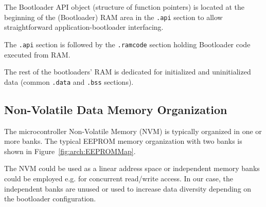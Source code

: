 The Bootloader API object (structure of function pointers) is located at the beginning of the (Bootloader) RAM area in the \texttt{.api} section to allow straightforward application-bootloader interfacing. 

The \texttt{.api} section is followed by the \texttt{.ramcode} section holding Bootloader code executed from RAM. 

The rest of the bootloaders' RAM is dedicated for initialized and uninitialized data (common \texttt{.data} and \texttt{.bss} sections).



\clearpage
\subsection{Non-Volatile Data Memory Organization} \label{sec:arch:EEPROMMap}

The microcontroller Non-Volatile Memory (NVM) is typically organized in one or more banks.
The typical EEPROM memory organization with two banks is shown in Figure~\ref{fig:arch:EEPROMMap}.



The NVM could be used as a linear address space or independent memory banks could be employed e.g. for concurrent read/write access.
In our case, the independent banks are unused or used to increase data diversity depending on the bootloader configuration. 

